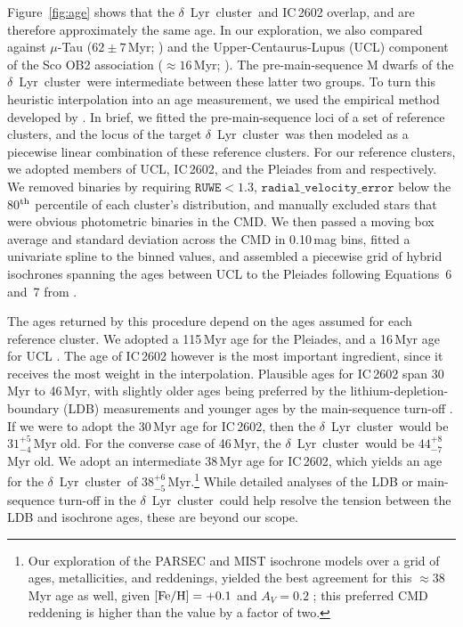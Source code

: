 \documentclass[12pt,modern,twocolumn,tighten]{aastex63}
\newcommand{\cn}{$\delta$\ Lyr\ cluster} %
\newcommand{\clusterage}{$38^{+6}_{-5}$\,Myr} %
\begin{document}
Figure~\ref{fig:age} shows that the \cn\ and IC\,2602 overlap, and are
therefore approximately the same age.  In our exploration, we also
compared against $\mu$-Tau ($62\pm7$\,Myr; \citealt{gagne_mutau_2020})
and the Upper-Centaurus-Lupus (UCL) component of the Sco OB2
association ($\approx$$16$\,Myr; \citealt{pecaut_star_2016}).  The
pre-main-sequence M dwarfs of the \cn\ were intermediate between these
latter two groups.  To turn this heuristic interpolation into an
age measurement, we used the empirical method
developed by \citet{gagne_mutau_2020}.  In brief, we fitted the
pre-main-sequence loci of a set of reference clusters, and the locus
of the target \cn\ was then modeled as a piecewise linear combination
of these reference clusters.  For our reference clusters, we adopted
members of UCL, IC\,2602, and the Pleiades from
\citet{damiani_stellar_2019} and \cite{CantatGaudin2018a}
respectively.  We removed binaries by requiring $\texttt{RUWE}<1.3$,
$\texttt{radial\_velocity\_error}$ below the 80$^{\rm th}$ percentile
of each cluster's distribution, and manually excluded stars that
were obvious photometric binaries in the CMD.  We then passed a moving
box average and standard deviation across the CMD in 0.10\,mag bins,
fitted a univariate spline to the binned values, and assembled a
piecewise grid of hybrid isochrones spanning the ages between UCL to
the Pleiades following Equations~6 and~7 from
\citet{gagne_mutau_2020}.  


The ages returned by this procedure depend on the ages assumed for
each reference cluster.  We adopted a 115\,Myr age for the Pleiades,
and a 16\,Myr age for UCL \citep{dahm_2015,pecaut_star_2016}.  The age
of IC\,2602 however is the most important ingredient, since it
receives the most weight in the interpolation.  Plausible ages for
IC\,2602 span 30\,Myr to 46\,Myr, with slightly older ages being
preferred by the lithium-depletion-boundary (LDB) measurements and
younger ages by the main-sequence turn-off
\citep{stauffer_rotational_1997,dobbie_ic_2010,david_ages_2015,randich_gaiaeso_2018,bossini_age_2019,bouma_cluster_2020}.
If we were to adopt the 30\,Myr age for IC\,2602, then the \cn\ would
be $31^{+5}_{-4}$\,Myr old.  For the converse case of 46\,Myr, the
\cn\ would be $44^{+8}_{-7}$\,Myr old.  We adopt an intermediate
38\,Myr age for IC\,2602, which yields an age for the \cn\ of
\clusterage.\footnote{Our exploration of the PARSEC and MIST
isochrone models over a grid of ages, metallicities, and
reddenings, yielded the best agreement for this $\approx 38\,$Myr age
as well, given ${\rm [Fe/H] = +0.1}$ and $A_V=0.2$
\citep{bressan_parsec_2012,choi_mesa_2016};  this preferred CMD reddening
is higher than the \citet{lallement_threedimensional_2018} value by a factor of two.
} While detailed analyses of the LDB or main-sequence turn-off in the
\cn\ could help resolve the tension between the LDB and isochrone
ages, these are beyond our scope.
\end{document}
